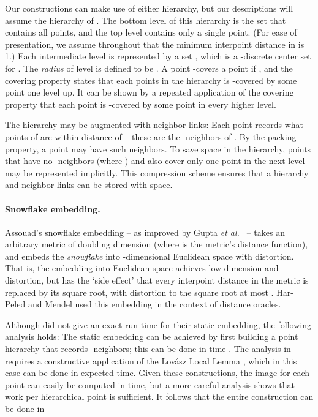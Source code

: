 \documentclass[11pt]{article}
\def\Lovasz{Lov{\'a}sz }
\newcommand{\etal}{{\em et al.\ }}
\begin{document}
Our constructions can make use of either hierarchy, but our descriptions will
assume the hierarchy of \cite{CoGo06}.
The bottom level of this hierarchy is the set  that contains all points, and the top level  contains only a single point.
(For ease of presentation, we assume throughout
that the minimum interpoint distance in  is 1.) Each intermediate
level  is represented by a set , which is a
-discrete center set for .
The {\em radius} of level  is defined to be . A point  -covers a point  if ,
and the covering property states that each points in the hierarchy is
-covered by some point one level up. It can be shown by a
repeated application of the covering property that each point is
-covered by some point in every higher level.

The hierarchy may be augmented with neighbor links: Each point  records what points of  are within distance  of  -- these are the -neighbors of . By the packing property, a point may have
 such neighbors. To save space in the hierarchy, points
that have no -neighbors (where ) and also cover only one point
in the next level may be represented implicitly. This compression scheme
ensures that a hierarchy and neighbor links can be stored with
 space.


\paragraph{\bf Snowflake embedding.}
Assouad's \cite{Assouad83} snowflake embedding -- as improved by Gupta \etal
\cite{GuKrLe03} -- takes an arbitrary metric  of
doubling dimension  (where  is the metric's distance
function), and embeds the {\em snowflake}  into -dimensional Euclidean space with  distortion.
That is, the embedding into Euclidean space achieves low
dimension and distortion, but has the `side effect' that every
interpoint distance in the metric is replaced by its square root, with
distortion to the square root at most . Har-Peled and Mendel
\cite{HaPe06} used this embedding in the context of distance oracles.

Although \cite{GuKrLe03} did not give an exact run time
for their static embedding, the following analysis holds: The static
embedding can be achieved by first building a point hierarchy that records
-neighbors; this can be done in
 time
\cite{KrLe04,HaPe06,CoGo06}. The analysis in \cite{GuKrLe03} requires a
constructive application of the \Lovasz Local Lemma \cite{MoTa10}, which in this case
can be done in  expected time.
Given these constructions, the image for each point can easily be computed in
 time, but a more careful analysis
shows that  work per
hierarchical point is sufficient. It follows that the entire construction can be done in
\end{document}
